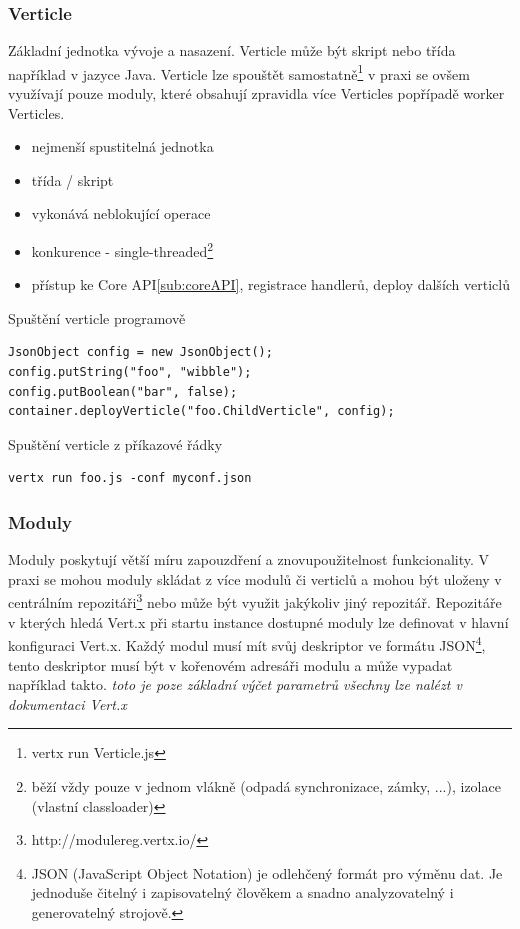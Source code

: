 \subsubsection{Verticle}

Základní jednotka vývoje a nasazení. Verticle může být skript nebo třída například v jazyce Java. Verticle lze spouštět samostatně\footnote{vertx run Verticle.js} v praxi se ovšem využívají pouze moduly, které obsahují zpravidla více Verticles popřípadě worker Verticles.

\begin{itemize}
\item nejmenší spustitelná jednotka
\item třída / skript
\item vykonává neblokující operace
\item konkurence - single-threaded\footnote{běží vždy pouze v jednom vlákně (odpadá synchronizace, zámky, ...), izolace (vlastní classloader)}
\item přístup ke Core API\ref{sub:coreAPI}, registrace handlerů, deploy dalších verticlů
\end{itemize}

Spuštění verticle programově
\begin{lstlisting}
JsonObject config = new JsonObject();
config.putString("foo", "wibble");
config.putBoolean("bar", false);
container.deployVerticle("foo.ChildVerticle", config);
\end{lstlisting}

Spuštění verticle z příkazové řádky
\begin{lstlisting}
vertx run foo.js -conf myconf.json
\end{lstlisting}

\subsubsection{Moduly} \label{sub:moduly}

Moduly poskytují větší míru zapouzdření a znovupoužitelnost funkcionality. V praxi se mohou moduly skládat z více modulů či verticlů a mohou být uloženy v centrálním repozitáři\footnote{http://modulereg.vertx.io/} nebo může být využit jakýkoliv jiný repozitář. Repozitáře v kterých hledá Vert.x při startu instance dostupné moduly lze definovat v hlavní konfiguraci Vert.x.
Každý modul musí mít svůj deskriptor ve formátu JSON\footnote{JSON (JavaScript Object Notation) je odlehčený formát pro výměnu dat. Je jednoduše čitelný i zapisovatelný člověkem a snadno analyzovatelný i generovatelný strojově.}, tento deskriptor musí být v kořenovém adresáři modulu a může vypadat například takto. \emph{toto je poze základní výčet parametrů všechny lze nalézt v dokumentaci Vert.x}

